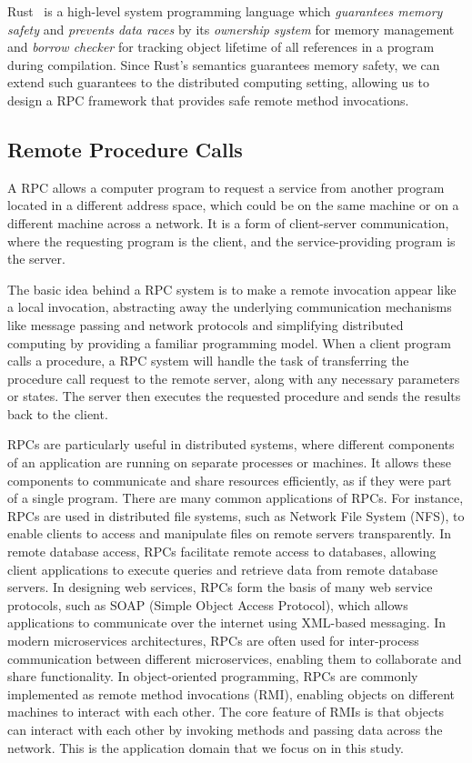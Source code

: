 Rust~\citep{10.5555/3271463} is a high-level system programming language which \emph{guarantees memory safety} and \emph{prevents data races} by its \emph{ownership system} for memory management and \emph{borrow checker} for tracking object lifetime of all references in a program during compilation.
Since Rust's semantics guarantees memory safety, we can extend such guarantees to the distributed computing setting, allowing us to design a RPC framework that provides safe remote method invocations.

\subsection{Remote Procedure Calls}
\label{chap3:background:rpc}
A RPC allows a computer program to request a service from another program located in a different address space, which could be on the same machine or on a different machine across a network. It is a form of client-server communication, where the requesting program is the client, and the service-providing program is the server.

The basic idea behind a RPC system is to make a remote invocation appear like a local invocation, abstracting away the underlying communication mechanisms like message passing and network protocols and simplifying distributed computing by providing a familiar programming model. When a client program calls a procedure, a RPC system will handle the task of transferring the procedure call request to the remote server, along with any necessary parameters or states. The server then executes the requested procedure and sends the results back to the client.

RPCs are particularly useful in distributed systems, where different components of an application are running on separate processes or machines. It allows these components to communicate and share resources efficiently, as if they were part of a single program. There are many common applications of RPCs. For instance, RPCs are used in distributed file systems, such as Network File System (NFS), to enable clients to access and manipulate files on remote servers transparently. In remote database access, RPCs facilitate remote access to databases, allowing client applications to execute queries and retrieve data from remote database servers. In designing web services, RPCs form the basis of many web service protocols, such as SOAP (Simple Object Access Protocol), which allows applications to communicate over the internet using XML-based messaging. In modern microservices architectures, RPCs are often used for inter-process communication between different microservices, enabling them to collaborate and share functionality. In object-oriented programming, RPCs are commonly implemented as remote method invocations (RMI), enabling objects on different machines to interact with each other. The core feature of RMIs is that objects can interact with each other by invoking methods and passing data across the network. This is the application domain that we focus on in this study.

